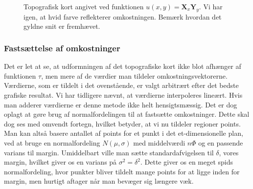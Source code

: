 {\begin{figure}[h]
    \setlength\fboxsep{0pt}
    \setlength\fboxrule{0.5pt}
    \begin{center}
    \end{center}
    \caption[]{Topografisk kort angivet ved funktionen $u(x, y) =
    \mathbf{X}_x\mathbf{Y}_y$. Vi har igen, at hvid farve reflekterer
    omkostningen. Bemærk hvordan det gyldne snit er fremhævet.}
    \label{topography_times}
\end{figure}

\subsubsection*{Fastsættelse af omkostninger}
Det er let at se, at udformningen af det topografiske kort ikke blot
afhænger af funktionen $\tau$, men mere af de værdier man tildeler
omkostningsvektorerne. Værdierne, som er tildelt i det ovenstående, er
valgt arbitrært efter det bedste grafiske resultat. Vi har tidligere
nævnt, at værdierne interpoleres lineært. Hvis man adderer værdierne er
denne metode ikke helt hensigtsmæssig. Det er dog oplagt at gøre brug af
normalfordelingen til at fastsætte omkostninger. Dette skal dog ses med
omvendt fortegn, hvilket betyder, at vi nu tildeler regioner points. Man
kan altså basere antallet af points for et punkt i det et-dimensionelle
plan, ved at bruge en normalfordeling $N(\mu, \sigma)$ med middelværdi
$n\varPhi$ og en passende varians til margin. Umiddelbart ville man
sætte standardafvigelsen til $\delta$, vores margin, hvilket giver os en
varians på $\sigma^{2} = \delta^{2}$. Dette giver os en meget spids
normalfordeling, hvor punkter bliver tildelt mange points for at ligge
inden for margin, men hurtigt aftager når man bevæger sig længere væk.


}

